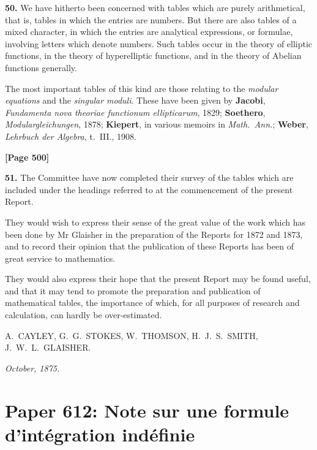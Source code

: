 \documentclass[11pt,a4paper]{book}
\begin{document}
\textbf{50.} We have hitherto been concerned with tables which are purely arithmetical,
that is, tables in which the entries are numbers. But there are also tables of a mixed
character, in which the entries are analytical expressions, or formulae, involving letters
which denote numbers. Such tables occur in the theory of elliptic functions, in the
theory of hyperelliptic functions, and in the theory of Abelian functions generally.

The most important tables of this kind are those relating to the \textit{modular equations}
and the \textit{singular moduli}. These have been given by
\quad\textbf{Jacobi}, \textit{Fundamenta nova theoriae functionum ellipticarum}, 1829;
\quad\textbf{Soethero}, \textit{Modulargleichungen}, 1878;
\quad\textbf{Kiepert}, in various memoirs in \textit{Math.\ Ann.};
\quad\textbf{Weber}, \textit{Lehrbuch der Algebra}, t.\ III., 1908.

\newpage
\textbf{[Page 500]}

\textbf{51.} The Committee have now completed their survey of the tables which are
included under the headings referred to at the commencement of the present Report.

They would wish to express their sense of the great value of the work which has
been done by Mr Glaisher in the preparation of the Reports for 1872 and 1873,
and to record their opinion that the publication of these Reports has been of great
service to mathematics.

They would also express their hope that the present Report may be found useful,
and that it may tend to promote the preparation and publication of mathematical
tables, the importance of which, for all purposes of research and calculation, can
hardly be over-estimated.

\vspace{1em}
\begin{flushright}
A.\ CAYLEY,
G.\ G.\ STOKES,
W.\ THOMSON,
H.\ J.\ S.\ SMITH,
J.\ W.\ L.\ GLAISHER.
\end{flushright}

\textit{October, 1875.}


\newpage
\section{Paper 612: Note sur une formule d'int\' egration ind\' efinie}
\end{document}
